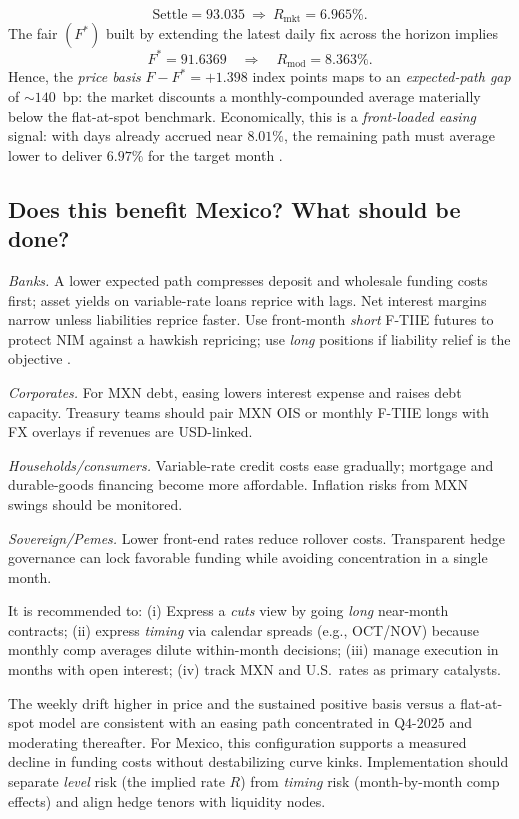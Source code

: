 \documentclass[11pt,a4paper]{article} %
\begin{document}
\[
\text{Settle} = {93.035}\ \Rightarrow\ R_{\text{mkt}}={6.965\%}.
\]
The fair \((F^{*})\) built by extending the latest daily fix across the horizon implies
\[
F^{*}={91.6369}\quad\Rightarrow\quad R_{\text{mod}}={8.363\%}.
\]
Hence, the \emph{price basis} \(F-F^{*}={+1.398}\) index points maps to an \emph{expected-path gap} of \(\sim{140}\)~bp: the market discounts a monthly-compounded average materially below the flat-at-spot benchmark. Economically, this is a \emph{front-loaded easing} signal: with days already accrued near \(8.01\%\), the remaining path must average lower to deliver \(6.97\%\) for the target month \citep{banxico_on_method_en,cme_tiie_monthly_method}.

\subsection{Does this benefit Mexico? What should be done?}
\textit{Banks.} A lower expected path compresses deposit and wholesale funding costs first; asset yields on variable-rate loans reprice with lags. Net interest margins narrow unless liabilities reprice faster. Use front-month \textit{short} F-TIIE futures to protect NIM against a hawkish repricing; use \textit{long} positions if liability relief is the objective \citep{cme_ftiie_article}.

\textit{Corporates.} For MXN debt, easing lowers interest expense and raises debt capacity. Treasury teams should pair MXN OIS or monthly F-TIIE longs with FX overlays if revenues are USD-linked.

\textit{Households/consumers.} Variable-rate credit costs ease gradually; mortgage and durable-goods financing become more affordable. Inflation risks from MXN swings should be monitored.

\textit{Sovereign/Pemes.} Lower front-end rates reduce rollover costs. Transparent hedge governance can lock favorable funding while avoiding concentration in a single month.

It is recommended to:
(i) Express a \emph{cuts} view by going \textit{long} near-month contracts; 
(ii) express \emph{timing} via calendar spreads (e.g., OCT/NOV) because monthly comp averages dilute within-month decisions; 
(iii) manage execution in months with open interest; 
(iv) track MXN and U.S.\ rates as primary catalysts.

\medskip
The weekly drift higher in price and the sustained positive basis versus a flat-at-spot model are consistent with an easing path concentrated in \(\text{Q4-2025}\) and moderating thereafter. For Mexico, this configuration supports a measured decline in funding costs without destabilizing curve kinks. Implementation should separate \emph{level} risk (the implied rate \(R\)) from \emph{timing} risk (month-by-month comp effects) and align hedge tenors with liquidity nodes.
\end{document}
